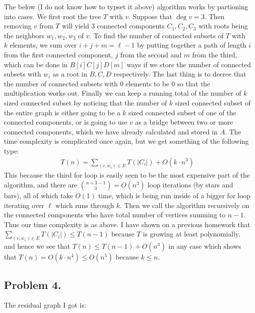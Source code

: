 \documentclass[12pt]{article}
\theoremstyle{definitionstyle}
\begin{document}
    The below (I do not know how to typset it above) algorithm works by partioning into cases. We first root the tree $T$ with $v$. Suppose that $\deg v = 3$. Then removing $v$ from $T$ will yield 3 connected components $C_1, C_2, C_3$ with roots being the neighbors $w_1, w_2, w_3$ of $v$. To find the number of connected subsets of $T$ with $k$ elements, we sum over $i + j + m = \ell-1$ by putting together a path of length $i$ from the first connected component, $j$ from the second and $m$ from the third, which can be done in $B[i]C[j]D[m]$ ways if we store the number of connected subsets with $w_i$ as a root in $B, C, D$ respectively. The last thing is to decree that the number of connected subsets with $0$ elements to be 0 so that the multiplication works out. Finally we can keep a running total of the number of $k$ sized connected subset by noticing that the number of $k$ sized connected subset of the entire graph is either going to be a $k$ sized connected subset of one of the connected components, or is going to use $v$ as a bridge between two or more connected components, which we have already calculated and stored in $A$. The time complexity is complicated once again, but we get something of the following type:
    \begin{align*}
        T(n) = \sum_{(v,w_i) \in E} T(|C_i|) + O(k \cdot n^3)
    \end{align*} 
    This because the third for loop is easily seen to be the most expensive part of the algorithm, and there are ${n + 3 - 1 \choose 3} = O(n^3)$ loop iterations (by stars and bars), all of which take $O(1)$ time, which is being run inside of a bigger for loop iterating over $\ell$ which runs through $k$. Then we call the algorithm recursively on the connected components who have total number of vertices summing to $n-1$. Thus our time complexity is as above. I have shown on a previous homework that $\sum_{(v,w_i) \in E} T(|C_i|) \leq T(n-1)$ because $T$ is growing at least polynomially, and hence we see that $T(n) \leq T(n-1) + O(n^3)$ in any case which shows that $T(n) = O(k \cdot n^4) \leq O(n^5)$ because $k \leq n$.

    \newpage
    \subsection*{Problem 4.}
    The residual graph I got is:
\end{document}
